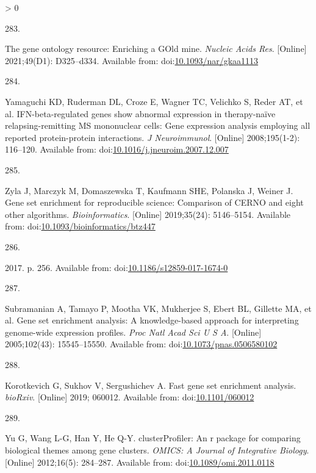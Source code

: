 \documentclass[twoside,10pt]{gihclass} %
\newlength{\cslhangindent}
\newlength{\csllabelwidth}
\newenvironment{CSLReferences}[3] %
 {%
  \setlength{\parindent}{0pt}
  \ifodd #1 \everypar{\setlength{\hangindent}{\cslhangindent}}\ignorespaces\fi
  \ifnum #2 > 0
  \setlength{\parskip}{#2\baselineskip}
  \fi
 }%
 {}
\newcommand{\CSLLeftMargin}[1]{\parbox[t]{\maxof{\widthof{#1}}{\csllabelwidth}}{#1}}
\newcommand{\CSLRightInline}[1]{\parbox[t]{\linewidth}{#1}}
\begin{document}
\begin{CSLReferences}{0}{0}
\leavevmode\hypertarget{ref-RN2890}{}%
\CSLLeftMargin{283. }
\CSLRightInline{The gene ontology resource: Enriching a GOld mine. \emph{Nucleic Acids Res}. {[}Online{]} 2021;49(D1): D325--d334. Available from: doi:\href{https://doi.org/10.1093/nar/gkaa1113}{10.1093/nar/gkaa1113}}

\leavevmode\hypertarget{ref-RN2439}{}%
\CSLLeftMargin{284. }
\CSLRightInline{Yamaguchi KD, Ruderman DL, Croze E, Wagner TC, Velichko S, Reder AT, et al. IFN-beta-regulated genes show abnormal expression in therapy-naïve relapsing-remitting MS mononuclear cells: Gene expression analysis employing all reported protein-protein interactions. \emph{J Neuroimmunol}. {[}Online{]} 2008;195(1-2): 116--120. Available from: doi:\href{https://doi.org/10.1016/j.jneuroim.2007.12.007}{10.1016/j.jneuroim.2007.12.007}}

\leavevmode\hypertarget{ref-RN2438}{}%
\CSLLeftMargin{285. }
\CSLRightInline{Zyla J, Marczyk M, Domaszewska T, Kaufmann SHE, Polanska J, Weiner J. Gene set enrichment for reproducible science: Comparison of CERNO and eight other algorithms. \emph{Bioinformatics}. {[}Online{]} 2019;35(24): 5146--5154. Available from: doi:\href{https://doi.org/10.1093/bioinformatics/btz447}{10.1093/bioinformatics/btz447}}

\leavevmode\hypertarget{ref-RN2435}{}%
\CSLLeftMargin{286. }
\CSLRightInline{2017. p. 256. Available from: doi:\href{https://doi.org/10.1186/s12859-017-1674-0}{10.1186/s12859-017-1674-0}}

\leavevmode\hypertarget{ref-RN2432}{}%
\CSLLeftMargin{287. }
\CSLRightInline{Subramanian A, Tamayo P, Mootha VK, Mukherjee S, Ebert BL, Gillette MA, et al. Gene set enrichment analysis: A knowledge-based approach for interpreting genome-wide expression profiles. \emph{Proc Natl Acad Sci U S A}. {[}Online{]} 2005;102(43): 15545--15550. Available from: doi:\href{https://doi.org/10.1073/pnas.0506580102}{10.1073/pnas.0506580102}}

\leavevmode\hypertarget{ref-RN2434}{}%
\CSLLeftMargin{288. }
\CSLRightInline{Korotkevich G, Sukhov V, Sergushichev A. Fast gene set enrichment analysis. \emph{bioRxiv}. {[}Online{]} 2019; 060012. Available from: doi:\href{https://doi.org/10.1101/060012}{10.1101/060012}}

\leavevmode\hypertarget{ref-clusterProfiler}{}%
\CSLLeftMargin{289. }
\CSLRightInline{Yu G, Wang L-G, Han Y, He Q-Y. clusterProfiler: An r package for comparing biological themes among gene clusters. \emph{OMICS: A Journal of Integrative Biology}. {[}Online{]} 2012;16(5): 284--287. Available from: doi:\href{https://doi.org/10.1089/omi.2011.0118}{10.1089/omi.2011.0118}}


\end{CSLReferences}
\end{document}
